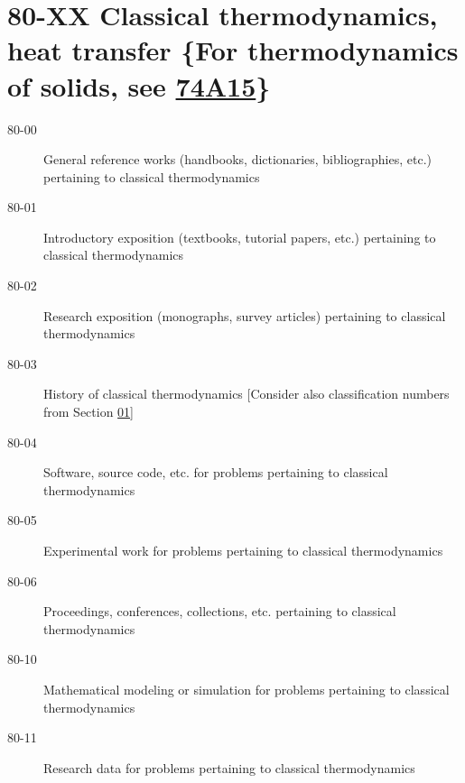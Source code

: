 \documentclass[letterpaper]{article}
\begin{document}
\section*{80-XX Classical thermodynamics, heat transfer \{For thermodynamics of solids, see \hyperref[74A15]{74A15}\} }\label{80-XX}
\begin{description}
\item [80-00]\label{80-00} General reference works (handbooks, dictionaries, bibliographies, etc.) pertaining to classical thermodynamics
\item [80-01]\label{80-01} Introductory exposition (textbooks, tutorial papers, etc.) pertaining to classical thermodynamics
\item [80-02]\label{80-02} Research exposition (monographs, survey articles) pertaining to classical thermodynamics
\item [80-03]\label{80-03} History of classical thermodynamics [Consider also classification numbers from Section \hyperref[01-XX]{01}]
\item [80-04]\label{80-04} Software, source code, etc. for problems pertaining to classical thermodynamics
\item [80-05]\label{80-05} Experimental work for problems pertaining to classical thermodynamics
\item [80-06]\label{80-06} Proceedings, conferences, collections, etc. pertaining to classical thermodynamics
\item [80-10]\label{80-10} Mathematical modeling or simulation for problems pertaining to classical thermodynamics
\item [80-11]\label{80-11} Research data for problems pertaining to classical thermodynamics
\end{description}
\end{document}
